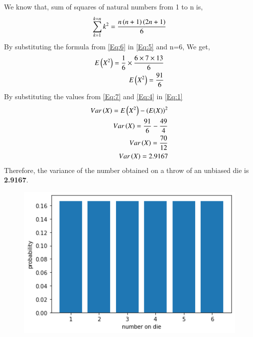 \documentclass[journal,12pt,twocolumn]{IEEEtran}
\begin{document}
We know that, sum of squares of natural numbers from 1 to n is,
\begin{align}
\sum_{k=1}^{k=n} k^{2} = \frac{n\left(n+1\right)\left(2n+1\right)}{6} \label{Eq:6}
\end{align}
By substituting the formula from \eqref{Eq:6} in \eqref{Eq:5} and n=6, We get,
\begin{align}
E\left(X^{2}\right)=\frac{1}{6} \times \frac{6\times7\times13}{6} \notag \\
E\left(X^{2}\right)=\frac{91}{6} \label{Eq:7}
\end{align}
By substituting the values from \eqref{Eq:7} and \eqref{Eq:4} in \eqref{Eq:1}
\begin{align}
Var\left(X\right) = E\left(X^{2}\right)-\left(E(X)\right)^{2} \notag \\
Var\left(X\right) = \frac{91}{6} - \frac{49}{4} \notag \\
Var\left(X\right) = \frac{70}{12} \notag \\
Var\left(X\right) = 2.9167 \label{Eq:8}
\end{align}
Therefore, the variance of the number obtained on a throw of an unbiased die is \textbf{2.9167}.
\newpage
\begin{figure}
    \centering
    \includegraphics[width=18cm]{Assignment_2.png}
\end{figure}
\end{document}
